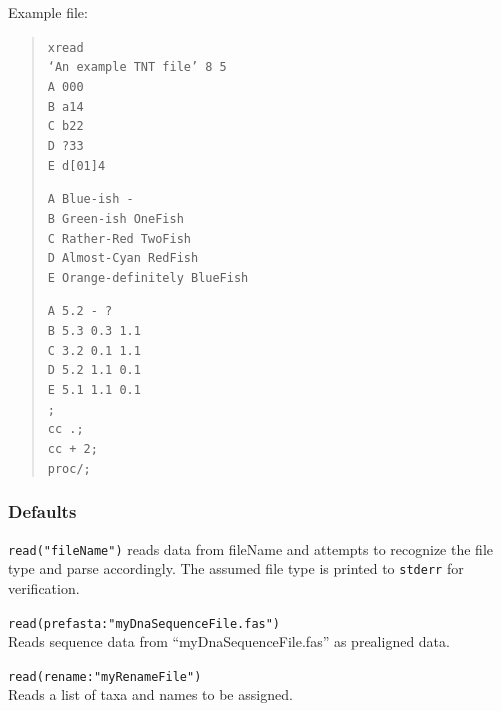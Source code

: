 \begin{description}
		  Example file:
		  	\begin{quote}
			  	\texttt{xread\\
				  	`An example TNT file' 8 5\\
				  	A 000\\
				  	B a14\\
				  	C b22\\
				  	D ?33\\
				  	E d[01]4\\}
			  	
			  	\texttt{A Blue-ish -\\
				  	B Green-ish OneFish\\
				  	C Rather-Red TwoFish\\
				  	D Almost-Cyan RedFish\\
				  	E Orange-definitely BlueFish\\}
					
				\texttt{A 5.2 - ?\\
					 B 5.3 0.3 1.1\\
					 C 3.2 0.1 1.1\\
					 D 5.2 1.1 0.1\\
					 E 5.1 1.1 0.1\\
				  	;\\
				  	cc .;\\
				  	cc + 2;\\
				  	proc/;\\}
			  \end{quote}
	\end{description}	
		
	\subsubsection{Defaults}
		\texttt{read("fileName")} reads data from fileName and attempts to recognize the 
		file type and parse accordingly. The assumed file type is printed to \texttt{stderr} for 
		verification.
		
	\begin{example}
		
		\item{\texttt{read(prefasta:"myDnaSequenceFile.fas")}\\ Reads sequence data from 
		``myDnaSequenceFile.fas'' as prealigned data.}
		
		\item{\texttt{read(rename:"myRenameFile")}\\ Reads a list of taxa and names to be 
		assigned.} 
		
	\end{example}
		
